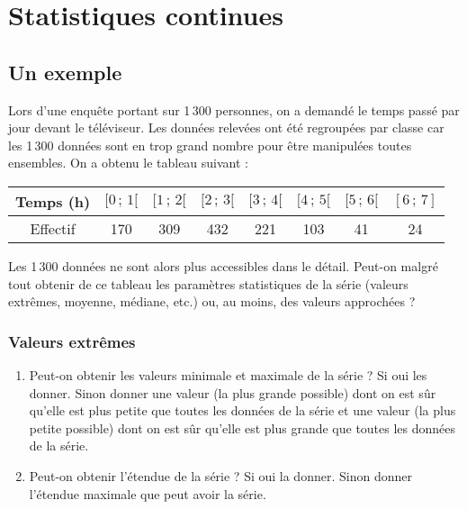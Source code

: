 \chapter{Statistiques continues} \label{statistiquescontinues}
\minitoc

\fancyhead{} %
\fancyhead[LE,RO]{\footnotesize \em \rightmark} %

    \fancyfoot{}
    \fancyfoot[LE,RO]{\textbf{\thepage}}




\section{Un exemple}




Lors d'une enquête portant sur 1\,300 personnes, on a demandé le temps passé par jour devant le téléviseur. Les
données relevées ont été regroupées par classe car les 1\,300 données sont en trop grand nombre pour être
manipulées toutes ensembles.
On a obtenu le tableau suivant :
\begin{center}
\begin{tabular}{|*{8}{c|}}
\hline
Temps (h) & $[0\, ;\, 1[$ &$[1 \, ;\, 2[$ &$[2 \, ;\, 3[$ &$[3 \, ;\, 4[$ &$[4 \, ;\, 5[$& $[5 \, ;\, 6[$ &$[6 \, ;\, 7]$\\ \hline
Effectif& 170& 309& 432& 221& 103& 41& 24\\ \hline
\end{tabular}
\end{center}
Les 1\,300 données ne sont alors plus accessibles dans le détail. Peut-on malgré tout obtenir de ce tableau les
paramètres statistiques de la série (valeurs extrêmes, moyenne, médiane, etc.) ou, au moins, des valeurs
approchées ?

\subsection{Valeurs extrêmes}
	\begin{enumerate}
	\item Peut-on obtenir les valeurs minimale et maximale de la série ?
Si oui les donner.
Sinon donner une valeur (la plus grande possible) dont on est sûr qu'elle est plus petite que toutes les
données de la série et une valeur (la plus petite possible) dont on est sûr qu'elle est plus grande que toutes
les données de la série.
\item Peut-on obtenir l'étendue de la série ?
Si oui la donner.
Sinon donner l'étendue maximale que peut avoir la série.
\end{enumerate}

